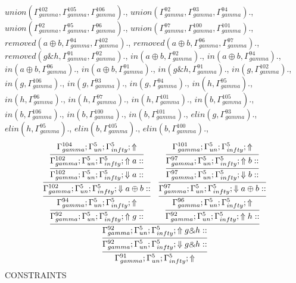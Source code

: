\documentclass[a4paper, 11pt]{article}
\begin{document}
$union(\Gamma_{gamma}^{102}, \Gamma_{gamma}^{105}, \Gamma_{gamma}^{106}).$, $union(\Gamma_{gamma}^{92}, \Gamma_{gamma}^{93}, \Gamma_{gamma}^{94}).$, $union(\Gamma_{gamma}^{92}, \Gamma_{gamma}^{95}, \Gamma_{gamma}^{96}).$, $union(\Gamma_{gamma}^{97}, \Gamma_{gamma}^{100}, \Gamma_{gamma}^{101}).$, $removed(a \oplus b, \Gamma_{gamma}^{94}, \Gamma_{gamma}^{102}).$, $removed(a \oplus b, \Gamma_{gamma}^{96}, \Gamma_{gamma}^{97}).$, $removed(g \binampersand h, \Gamma_{gamma}^{91}, \Gamma_{gamma}^{92}).$, $in(a \oplus b, \Gamma_{gamma}^{92}).$, $in(a \oplus b, \Gamma_{gamma}^{94}).$, $in(a \oplus b, \Gamma_{gamma}^{96}).$, $in(a \oplus b, \Gamma_{gamma}^{91}).$, $in(g \binampersand h, \Gamma_{gamma}^{91}).$, $in(g, \Gamma_{gamma}^{102}).$, $in(g, \Gamma_{gamma}^{106}).$, $in(g, \Gamma_{gamma}^{93}).$, $in(g, \Gamma_{gamma}^{94}).$, $in(h, \Gamma_{gamma}^{95}).$, $in(h, \Gamma_{gamma}^{96}).$, $in(h, \Gamma_{gamma}^{97}).$, $in(h, \Gamma_{gamma}^{101}).$, $in(b, \Gamma_{gamma}^{105}).$, $in(b, \Gamma_{gamma}^{106}).$, $in(b, \Gamma_{gamma}^{100}).$, $in(b, \Gamma_{gamma}^{101}).$, $elin(g, \Gamma_{gamma}^{93}).$, $elin(h, \Gamma_{gamma}^{95}).$, $elin(b, \Gamma_{gamma}^{105}).$, $elin(b, \Gamma_{gamma}^{100}).$, 
{\small
\[
\infer{\Gamma_{ gamma}^{91} ; \Gamma_{un}^{5} ; \Gamma_{ infty}^{5} ;  \Uparrow }
{\infer{\Gamma_{ gamma}^{92} ; \Gamma_{un}^{5} ; \Gamma_{ infty}^{5} ;  \Downarrow g \binampersand h :: }
{\infer{\Gamma_{ gamma}^{92} ; \Gamma_{un}^{5} ; \Gamma_{ infty}^{5} ;  \Uparrow g \binampersand h :: }
{\infer{\Gamma_{ gamma}^{92} ; \Gamma_{un}^{5} ; \Gamma_{ infty}^{5} ;  \Uparrow g :: }
{\infer{\Gamma_{ gamma}^{94} ; \Gamma_{un}^{5} ; \Gamma_{ infty}^{5} ;  \Uparrow }
{\infer{\Gamma_{ gamma}^{102} ; \Gamma_{un}^{5} ; \Gamma_{ infty}^{5} ;  \Downarrow a \oplus b :: }
{\infer{\Gamma_{ gamma}^{102} ; \Gamma_{un}^{5} ; \Gamma_{ infty}^{5} ;  \Downarrow a :: }
{\infer{\Gamma_{ gamma}^{102} ; \Gamma_{un}^{5} ; \Gamma_{ infty}^{5} ;  \Uparrow a :: }
{\Gamma_{ gamma}^{104} ; \Gamma_{un}^{5} ; \Gamma_{ infty}^{5} ;  \Uparrow }}}}}
&
\infer{\Gamma_{ gamma}^{92} ; \Gamma_{un}^{5} ; \Gamma_{ infty}^{5} ;  \Uparrow h :: }
{\infer{\Gamma_{ gamma}^{96} ; \Gamma_{un}^{5} ; \Gamma_{ infty}^{5} ;  \Uparrow }
{\infer{\Gamma_{ gamma}^{97} ; \Gamma_{un}^{5} ; \Gamma_{ infty}^{5} ;  \Downarrow a \oplus b :: }
{\infer{\Gamma_{ gamma}^{97} ; \Gamma_{un}^{5} ; \Gamma_{ infty}^{5} ;  \Downarrow b :: }
{\infer{\Gamma_{ gamma}^{97} ; \Gamma_{un}^{5} ; \Gamma_{ infty}^{5} ;  \Uparrow b :: }
{\Gamma_{ gamma}^{101} ; \Gamma_{un}^{5} ; \Gamma_{ infty}^{5} ;  \Uparrow }}}}}}}}
\]
}
CONSTRAINTS
\end{document}
